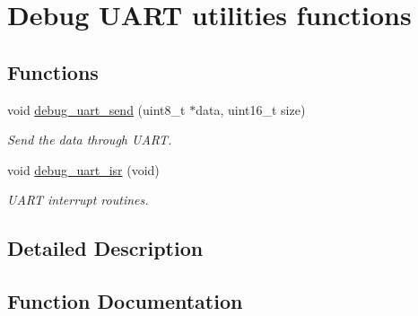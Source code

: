 \hypertarget{group___debug___uart___exported___functions___group2}{}\section{Debug U\+A\+RT utilities functions}
\label{group___debug___uart___exported___functions___group2}
\subsection*{Functions}
\begin{DoxyCompactItemize}
\item 
void \hyperlink{group___debug___uart___exported___functions___group2_ga3709c73faee84b7b9d4b9699a6035dfa}{debug\+\_\+uart\+\_\+send} (uint8\+\_\+t $\ast$data, uint16\+\_\+t size)
\begin{DoxyCompactList}\small\item\em Send the data through U\+A\+RT. \end{DoxyCompactList}\item 
void \hyperlink{group___debug___uart___exported___functions___group2_ga7a880511e4fc8f2c3cad647324136dd3}{debug\+\_\+uart\+\_\+isr} (void)\hypertarget{group___debug___uart___exported___functions___group2_ga7a880511e4fc8f2c3cad647324136dd3}{}\label{group___debug___uart___exported___functions___group2_ga7a880511e4fc8f2c3cad647324136dd3}

\begin{DoxyCompactList}\small\item\em U\+A\+RT interrupt routines. \end{DoxyCompactList}\end{DoxyCompactItemize}


\subsection{Detailed Description}


\subsection{Function Documentation}
